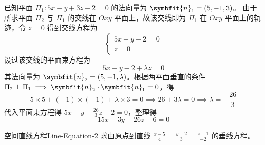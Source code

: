 \begin{solution}
    已知平面 $\Pi_1: 5x - y + 3z - 2 = 0$ 的法向量为 $\symbfit{n}_1 = (5, -1, 3)$。
    由于所求平面 $\Pi_2$ 与 $\Pi_1$ 的交线在 $Oxy$ 平面上，故该交线即为 $\Pi_1$ 在 $Oxy$ 平面上的轨迹，令 $z = 0$ 得到交线方程为
    \begin{equation*}
        \begin{cases}
            5x - y - 2 = 0 \\
            z = 0
        \end{cases}
    \end{equation*}
    设过该交线的平面束方程为
    \begin{equation*}
        5x - y - 2 + \lambda z = 0
    \end{equation*}
    其法向量为 $\symbfit{n}_2 = (5, -1, \lambda)$。根据两平面垂直的条件 $\Pi_2 \perp \Pi_1 \implies \symbfit{n}_2 \cdot \symbfit{n}_1 = 0$，得
    \begin{equation*}
        5 \times 5 + (-1) \times (-1) + \lambda \times 3 = 0 \implies 26 + 3\lambda = 0 \implies \lambda = -\frac{26}{3}
    \end{equation*}
    代入平面束方程得 $5x - y - \frac{26}{3}z - 2 = 0$，整理得
    \begin{equation*}
        \boxed{15x - 3y - 26z - 6 = 0}
    \end{equation*}
\end{solution}

\begin{problem}{空间直线方程}{Line-Equation-2}
    求由原点到直线 $\frac{x-5}{4} = \frac{y-2}{3} = \frac{z+1}{-2}$ 的垂线方程。
\end{problem}


